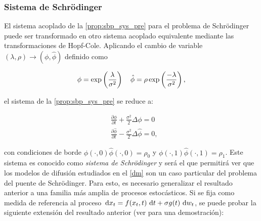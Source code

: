 \subsubsection{Sistema de Schrödinger}

El sistema acoplado de la \autoref{prop:sbp_sys_pre} para el problema de Schrödinger puede ser transformado en otro sistema acoplado equivalente mediante las transformaciones de Hopf-Cole. Aplicando el cambio de variable $(\lambda,\rho)\to(\phi,\hat\phi)$ definido como

\begin{equation*}
	\phi = \exp\left(\frac{\lambda}{\sigma^2}\right)
	\quad
	\hat\phi = \rho\exp\left(\frac{-\lambda}{\sigma^2}\right),
\end{equation*}

el sistema de la \autoref{prop:sbp_sys_pre} se reduce a:

\begin{align}
	&\frac{\partial\phi}{\partial t} + \frac{\sigma^2}{2}\Delta\phi = 0\\
	&\frac{\partial\hat\phi}{\partial t} - \frac{\sigma^2}{2}\Delta\hat\phi = 0,
\end{align}

con condiciones de borde $\phi(\cdot,0)\hat\phi(\cdot,0) = \rho_0$ y $\phi(\cdot,1)\hat\phi(\cdot,1) = \rho_1$. Este sistema es conocido como \textit{sistema de Schrödinger} y será el que permitirá ver que los modelos de difusión estudiados en el \autoref{dm} son un caso particular del problema del puente de Schrödinger. Para esto, es necesario generalizar el resultado anterior a una familia más amplia de procesos estocásticos. Si se fija como medida de referencia al proceso $\,\operatorname{d}\! x_t = f(x_t,t)\,\operatorname{d}\! t + \sigma g(t)\,\operatorname{d}\! w_t$, se puede probar la siguiente extensión del resultado anterior (ver \cite{chen2020stochasticcontrolliaisonsrichard} para una demostración):

